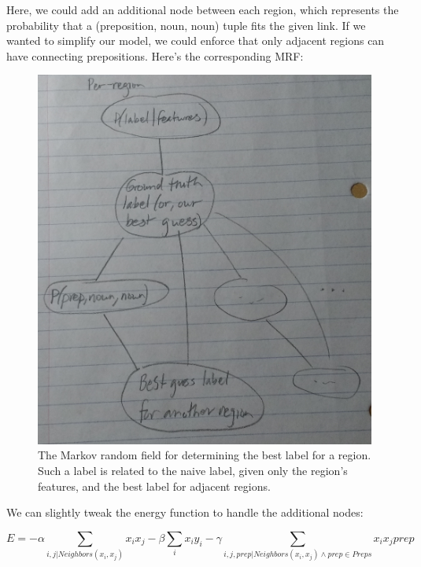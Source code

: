 \documentclass{article}
\begin{document}
Here, we could add an additional node between each region, which represents the 
probability that a (preposition, noun, noun) tuple fits the given link. If we 
wanted to simplify our model, we could enforce that only adjacent regions can 
have connecting prepositions. Here's the corresponding MRF:

\begin{figure}[!ht]
	\centering
	\includegraphics[width=120mm]{figs/region-by-noun-and-prep-mrf.jpg}
	\caption{The Markov random field for determining the best label for a 
        region. Such a label is related to the naive label, given only the 
        region's features, and the best label for adjacent regions.}
\end{figure}

We can slightly tweak the energy function to handle the additional nodes:

$$
E = - \alpha \sum_{i, j | Neighbors(x_i, x_j)} x_i x_j - \beta \sum_{i} x_i y_i - \gamma \sum_{i, j, prep | Neighbors(x_i, x_j) \wedge prep \in Preps} x_i x_j prep
$$
\end{document}
